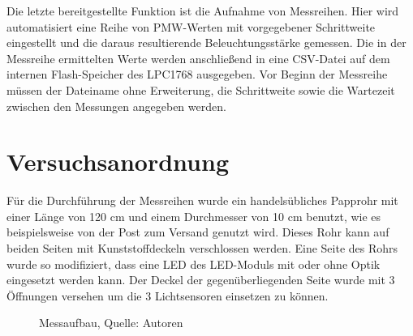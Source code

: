 \documentclass[a4paper,12pt]{scrartcl}
\begin{document}
Die letzte bereitgestellte Funktion ist die Aufnahme von Messreihen. Hier wird automatisiert eine Reihe von PMW-Werten mit vorgegebener Schrittweite eingestellt und die daraus resultierende Beleuchtungsstärke gemessen. Die in der Messreihe ermittelten Werte werden anschließend in eine CSV-Datei auf dem internen Flash-Speicher des LPC1768 ausgegeben. Vor Beginn der Messreihe müssen der Dateiname ohne Erweiterung, die Schrittweite sowie die Wartezeit zwischen den Messungen angegeben werden.

\clearpage
\section{Versuchsanordnung}
Für die Durchführung der Messreihen wurde ein handelsübliches Papprohr mit
einer Länge von 120 cm und einem Durchmesser von 10 cm benutzt, wie es beispielsweise von der Post zum Versand genutzt wird. Dieses Rohr
kann auf beiden Seiten mit Kunststoffdeckeln verschlossen werden. Eine Seite
des Rohrs wurde so modifiziert, dass eine LED des LED-Moduls mit oder ohne
Optik eingesetzt werden kann. Der Deckel der gegenüberliegenden Seite wurde mit
3 Öffnungen versehen um die 3 Lichtsensoren einsetzen zu können.

\begin{figure}[h] 
  \caption[Messaufbau]{\label{fotohwmessaufbau}Messaufbau, Quelle: Autoren}
\end{figure} 
\end{document}
